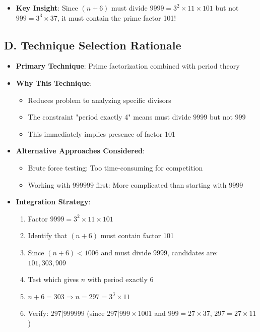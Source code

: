 \documentclass[11pt]{article}
\begin{document}
\begin{conversionbox}
\begin{itemize}[leftmargin=*]
    \item \textbf{Key Insight}: Since $(n+6)$ must divide $9999 = 3^2 \times 11 \times 101$ but not $999 = 3^3 \times 37$, it must contain the prime factor 101!
\end{itemize}

\subsection*{D. Technique Selection Rationale}
\begin{itemize}[leftmargin=*]
    \item \textbf{Primary Technique}: Prime factorization combined with period theory
    
    \item \textbf{Why This Technique}: 
    \begin{itemize}
        \item Reduces problem to analyzing specific divisors
        \item The constraint "period exactly 4" means must divide $9999$ but not $999$
        \item This immediately implies presence of factor 101
    \end{itemize}
    
    \item \textbf{Alternative Approaches Considered}:
    \begin{itemize}
        \item Brute force testing: Too time-consuming for competition
        \item Working with $999999$ first: More complicated than starting with $9999$
    \end{itemize}
    
    \item \textbf{Integration Strategy}: 
    \begin{enumerate}
        \item Factor $9999 = 3^2 \times 11 \times 101$
        \item Identify that $(n+6)$ must contain factor 101
        \item Since $(n+6) < 1006$ and must divide $9999$, candidates are: $101, 303, 909$
        \item Test which gives $n$ with period exactly 6
        \item $n+6 = 303 \Rightarrow n = 297 = 3^3 \times 11$
        \item Verify: $297 | 999999$ (since $297 | 999 \times 1001$ and $999 = 27 \times 37$, $297 = 27 \times 11$)
    \end{enumerate}
\end{itemize}
\end{conversionbox}
\end{document}
